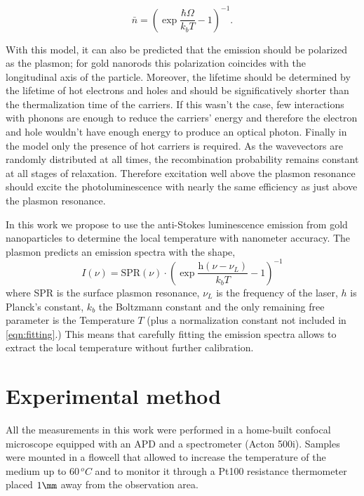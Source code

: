 \documentclass[journal=nalefd,manuscript=letter]{achemso}
\begin{document}
\begin{equation}
	\bar{n}=\left(\exp\frac{\hbar\Omega}{k_bT}-1\right)^{-1}.
\end{equation}

With this model, it can also be predicted that the emission should be polarized
as the plasmon; for gold nanorods this polarization coincides with the
longitudinal axis of the particle. Moreover, the lifetime should be determined
by the lifetime of hot electrons and holes and should be significatively shorter
than the thermalization time of the carriers. If this wasn't the case, few
interactions with phonons are enough to reduce the carriers' energy and
therefore the electron and hole wouldn't have enough energy to produce an
optical photon. Finally in the model only the presence of hot carriers is
required. As the wavevectors are randomly distributed at all times, the
recombination probability remains constant at all stages of relaxation.
Therefore excitation well above the plasmon resonance should excite the
photoluminescence with nearly the same efficiency as just above the plasmon
resonance. 

In this work we propose to use the anti-Stokes luminescence emission from gold
nanoparticles to determine the local temperature with nanometer accuracy. The
plasmon predicts an emission spectra with the shape,
\begin{equation}\label{eqn:fitting}
	I(\nu) =
	\textrm{SPR}(\nu)\cdot\left(\exp\frac{\textrm{h}(\nu-\nu_L)}{k_bT}-1\right)^{-1}
\end{equation}
where SPR is the surface plasmon resonance, $\nu_L$ is the frequency of the
laser, $h$ is Planck's constant, $k_b$ the Boltzmann constant and the only
remaining free parameter is the Temperature $T$ (plus a normalization constant
not included in \ref{eqn:fitting}.) This means that carefully fitting the
emission spectra allows to extract the local temperature without further
calibration.

\section{Experimental method}
All the measurements in this work were performed in a home-built confocal
microscope equipped with an APD and a spectrometer (Acton 500i). Samples were
mounted in a flowcell that allowed to increase the temperature of the medium up
to $60\,^oC$ and to monitor it through a Pt100 resistance thermometer placed
$1\mm$ away from the observation area.
\end{document}
